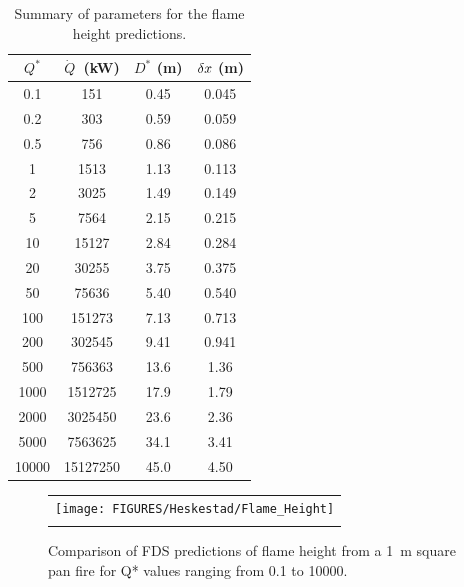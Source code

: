 \begin{table}[h!]
\caption{Summary of parameters for the flame height predictions.}
\begin{center}
\begin{tabular}{|c|c|c|c|}
\hline
$Q^*$       & $\dot{Q}$~(kW)   & $D^*$ (m)  & $\delta x$ (m)  \\ \hline \hline
0.1         &   151       & 0.45    &   0.045   \\ \hline
0.2         &   303       & 0.59    &   0.059   \\ \hline
0.5         &   756       & 0.86    &   0.086   \\ \hline
1           &   1513      & 1.13    &   0.113   \\ \hline
2         & 3025      & 1.49    &   0.149   \\ \hline
5         & 7564      & 2.15    &   0.215   \\ \hline
10       &  15127     & 2.84    &   0.284   \\ \hline
20       &  30255     & 3.75    &   0.375   \\ \hline
50       &  75636     & 5.40    &   0.540   \\ \hline
100     &   151273    & 7.13    &   0.713   \\ \hline
200     &   302545    & 9.41    &   0.941   \\ \hline
500     &   756363    & 13.6    &   1.36    \\ \hline
1000    &   1512725 &   17.9    &   1.79    \\ \hline
2000    &   3025450 &   23.6    &   2.36    \\ \hline
5000    &   7563625 &   34.1    &   3.41    \\ \hline
10000   &   15127250    &   45.0    &   4.50    \\ \hline
\end{tabular}
\end{center}
\label{Flame_Height_Parameters}
\end{table}

\begin{figure}[p]
\begin{center}
\begin{tabular}{c}
\texttt{[image: FIGURES/Heskestad/Flame\_Height]} \\
\vspace{0.25in} \\
\end{tabular}
\end{center}
\caption[Summary of flame height predictions, Heskestad correlation.]
{Comparison of FDS predictions of flame height from a 1~m square pan fire for Q* values ranging from
0.1 to 10000.}
\label{Flame_Height}
\end{figure}


